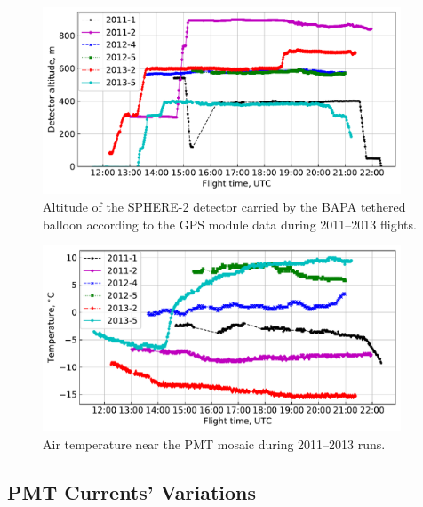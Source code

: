 \documentclass[universe,article,accept,moreauthors,pdftex]{Definitions/mdpi}
\begin{document}
\begin{figure}[H]    
        \includegraphics[width=0.95\textwidth]{Telemetry_height.pdf}
        \caption{Altitude of the SPHERE-2 detector carried by the BAPA tethered balloon according to the GPS module data during 2011--2013 flights.}
        \label{fig:height}
        \end{figure}
\unskip
        \begin{figure}[H] 
        \includegraphics[width=0.95\textwidth]{Telemetry_tmos.pdf}
        \caption{Air temperature near the PMT mosaic during 2011--2013 runs.}
        \label{fig:temperature}
\end{figure}





\subsection{PMT Currents' Variations}
\end{document}
